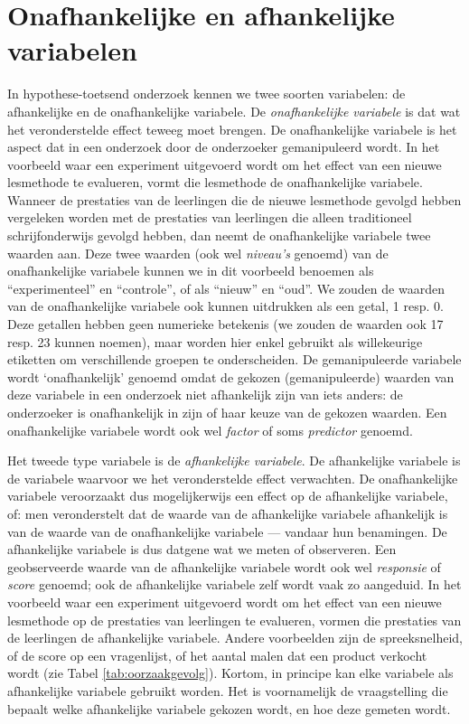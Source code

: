 \documentclass[
]{book}
\begin{document}
\hypertarget{sec:onafhankelijkeafhankelijkevariabelen}{%
\section{Onafhankelijke en afhankelijke variabelen}\label{sec:onafhankelijkeafhankelijkevariabelen}}

In hypothese-toetsend onderzoek kennen we twee soorten variabelen: de
afhankelijke en de onafhankelijke variabele. De \emph{onafhankelijke
variabele} is dat wat het veronderstelde effect teweeg moet brengen. De
onafhankelijke variabele is het aspect dat in een onderzoek door de
onderzoeker gemanipuleerd wordt. In het voorbeeld waar een experiment
uitgevoerd wordt om het effect van een nieuwe lesmethode te evalueren,
vormt die lesmethode de onafhankelijke variabele. Wanneer de prestaties
van de leerlingen die de nieuwe lesmethode gevolgd hebben vergeleken
worden met de prestaties van leerlingen die alleen traditioneel
schrijfonderwijs gevolgd hebben, dan neemt de onafhankelijke variabele
twee waarden aan. Deze twee waarden (ook wel \emph{niveau's} genoemd) van de
onafhankelijke variabele kunnen we in dit voorbeeld benoemen als
``experimenteel'' en ``controle'', of als ``nieuw'' en ``oud''. We zouden de
waarden van de onafhankelijke variabele ook kunnen uitdrukken als een
getal, 1 resp. 0. Deze getallen hebben geen numerieke betekenis (we
zouden de waarden ook 17 resp. 23 kunnen noemen), maar worden hier enkel
gebruikt als willekeurige etiketten om verschillende groepen te
onderscheiden. De gemanipuleerde variabele wordt `onafhankelijk' genoemd
omdat de gekozen (gemanipuleerde) waarden van deze variabele in een
onderzoek niet afhankelijk zijn van iets anders: de onderzoeker is
onafhankelijk in zijn of haar keuze van de gekozen waarden. Een
onafhankelijke variabele wordt ook wel \emph{factor} of soms \emph{predictor}
genoemd.

Het tweede type variabele is de \emph{afhankelijke variabele}. De
afhankelijke variabele is de variabele waarvoor we het veronderstelde
effect verwachten. De onafhankelijke variabele veroorzaakt dus
mogelijkerwijs een effect op de afhankelijke variabele, of: men
veronderstelt dat de waarde van de afhankelijke variabele afhankelijk is
van de waarde van de onafhankelijke variabele --- vandaar hun
benamingen. De afhankelijke variabele is dus datgene wat we meten of
observeren. Een geobserveerde waarde van de afhankelijke variabele wordt
ook wel \emph{responsie} of \emph{score} genoemd; ook de afhankelijke variabele
zelf wordt vaak zo aangeduid. In het voorbeeld waar een experiment
uitgevoerd wordt om het effect van een nieuwe lesmethode op de
prestaties van leerlingen te evalueren, vormen die prestaties van de
leerlingen de afhankelijke variabele. Andere voorbeelden zijn de
spreeksnelheid, of de score op een vragenlijst, of het aantal malen dat
een product verkocht wordt (zie Tabel \ref{tab:oorzaakgevolg}).
Kortom, in principe kan elke variabele
als afhankelijke variabele gebruikt worden. Het is voornamelijk de
vraagstelling die bepaalt welke afhankelijke variabele gekozen wordt, en
hoe deze gemeten wordt.
\end{document}
